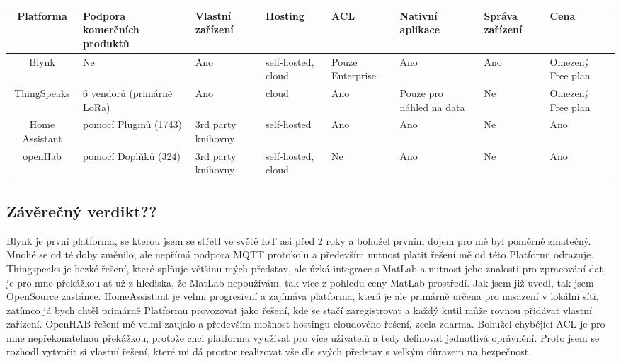 \documentclass[thesis=B,czech]{FITthesis}[2019/12/23]
\begin{document}
\begin{center} %
    \begin{tabular}{ |c| m{5em}| m{5em}|m{5em}|m{4em}| m{5em}| m{4em}| m{4em}| } 
     \hline 
     Platforma & Podpora komerčních produktů & Vlastní zařízení & Hosting & ACL & Nativní aplikace & Správa zařízení & Cena \\
     \hline
     Blynk & Ne & Ano & self-hosted, cloud & Pouze Enterprise & Ano & Ano &  Omezený Free plan\\
     \hline
     ThingSpeaks & 6 vendorů (primárně LoRa) & Ano & cloud & Ano & Pouze pro náhled na data & Ne & Omezený Free plan\\
     \hline
Home Assistant & pomocí Pluginů (1743) & 3rd party knihovny & self-hosted & Ano & Ano & Ne & Ano\\
\hline
openHab & pomocí Doplňků (324) & 3rd party knihovny & self-hosted, cloud & Ne & Ano & Ne & Ano\\
     \hline
    \end{tabular}
    \end{center} 

\subsection{Závěrečný verdikt??}
Blynk je první platforma, se kterou jsem se střetl ve světě IoT asi před 2 roky a bohužel prvním dojem pro mě byl poměrně zmatečný. Mnohé se od té doby změnilo, ale nepřímá podpora MQTT protokolu a především nutnost platit řešení mě od této Platformi odrazuje. Thingspeaks je hezké řešení, které splňuje většinu mých představ, ale úzká integrace s MatLab a nutnost jeho znalosti pro zpracování dat, je pro mne překážkou ať už z hlediska, že MatLab nepoužívám, tak více z pohledu ceny MatLab prostředí. Jak jsem již uvedl, tak jsem OpenSource zastánce. HomeAssistant je velmi progresivní a zajímáva platforma, která je ale primárně určena pro nasazení v lokální síti, zatímco já bych chtěl primárně Platformu provozovat jako řešení, kde se stačí zaregistrovat a každý kutil může rovnou přidávat vlastní zařízení. OpenHAB řešení mě velmi zaujalo a především možnost hostingu cloudového řešení, zcela zdarma. Bohužel chybějící ACL je pro mne nepřekonatelnou překážkou, protože chci platformu využívat pro více uživatelů a tedy definovat jednotlivá oprávnění. Proto jsem se rozhodl vytvořit si vlastní řešení, které mi dá prostor realizovat vše dle svých představ s velkým důrazem na bezpečnost.
\end{document}
